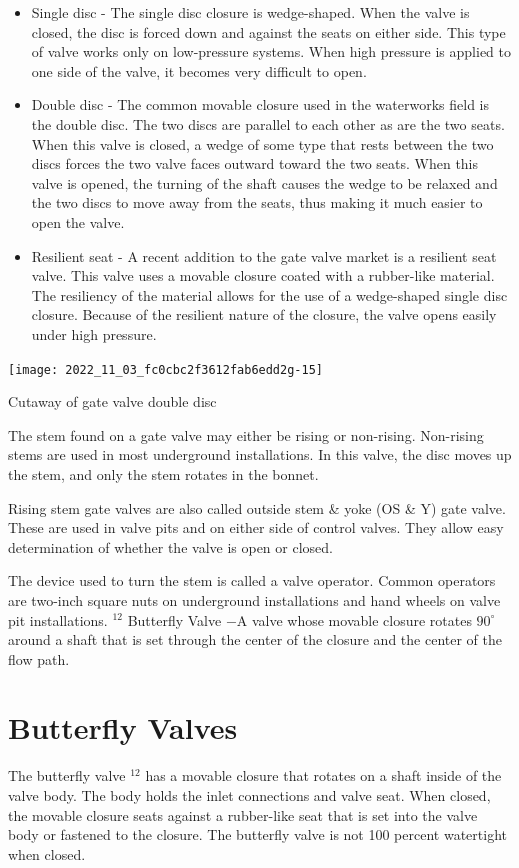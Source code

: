 \documentclass[10pt]{article}
\begin{document}
\begin{itemize}
  \item Single disc - The single disc closure is wedge-shaped. When the valve is closed, the disc is forced down and against the seats on either side. This type of valve works only on low-pressure systems. When high pressure is applied to one side of the valve, it becomes very difficult to open.

  \item Double disc - The common movable closure used in the waterworks field is the double disc. The two discs are parallel to each other as are the two seats. When this valve is closed, a wedge of some type that rests between the two discs forces the two valve faces outward toward the two seats. When this valve is opened, the turning of the shaft causes the wedge to be relaxed and the two discs to move away from the seats, thus making it much easier to open the valve.

  \item Resilient seat - A recent addition to the gate valve market is a resilient seat valve. This valve uses a movable closure coated with a rubber-like material. The resiliency of the material allows for the use of a wedge-shaped single disc closure. Because of the resilient nature of the closure, the valve opens easily under high pressure.

\end{itemize}
\texttt{[image: 2022\_11\_03\_fc0cbc2f3612fab6edd2g-15]}

Cutaway of gate valve double disc

The stem found on a gate valve may either be rising or non-rising. Non-rising stems are used in most underground installations. In this valve, the disc moves up the stem, and only the stem rotates in the bonnet.

Rising stem gate valves are also called outside stem \& yoke (OS \& Y) gate valve. These are used in valve pits and on either side of control valves. They allow easy determination of whether the valve is open or closed.

The device used to turn the stem is called a valve operator. Common operators are two-inch square nuts on underground installations and hand wheels on valve pit installations. ${ }^{12}$ Butterfly Valve $-\mathrm{A}$ valve whose movable closure rotates $90^{\circ}$ around a shaft that is set through the center of the closure and the center of the flow path.

\section{Butterfly Valves}
The butterfly valve ${ }^{12}$ has a movable closure that rotates on a shaft inside of the valve body. The body holds the inlet connections and valve seat. When closed, the movable closure seats against a rubber-like seat that is set into the valve body or fastened to the closure. The butterfly valve is not 100 percent watertight when closed.
\end{document}
